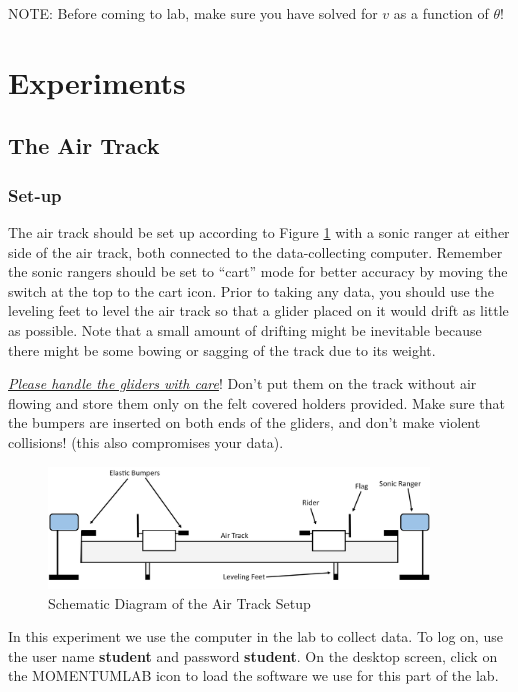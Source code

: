 NOTE: Before coming to lab, make sure you have solved for $v$ as a function of $\theta$!

\section{Experiments}
\subsection{The Air Track}

\subsubsection{Set-up}

The air track should be set up according to Figure \ref{fig:airtrack_p} with a sonic ranger at either side of the air track, both connected to the data-collecting computer. Remember the sonic rangers should be set to ``cart'' mode for better accuracy by moving the switch at the top to the cart icon. Prior to taking any data, you should use the leveling feet to level the air track so that a glider placed on it would drift as little as possible. Note that a small amount of drifting might be inevitable because there might be some bowing or sagging of the track due to its weight.\myskip

\underline{\emph{Please handle the gliders with care}}! Don't put them on the track without air flowing and store them only on the felt covered holders provided. Make sure that the bumpers are inserted on both ends of the gliders, and don't make violent collisions! (this also compromises your data).\myskip

\begin{figure}[h]
\begin{center}
        \includegraphics[width=0.9\textwidth]{Exp5/pic/image12.jpg}
    \caption{Schematic Diagram of the Air Track Setup}
    \label{fig:airtrack_p}
\end{center}
\end{figure}

In this experiment we use the computer in the lab to collect data. To log on, use the user name \textbf{student} and password \textbf{student}. On the desktop screen, click on the MOMENTUMLAB icon to load the software we use for this part of the lab.
\myskip

